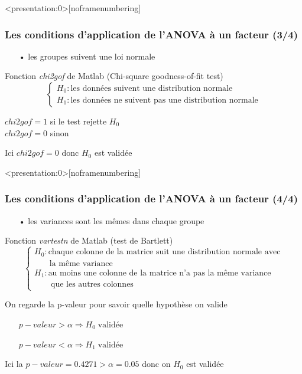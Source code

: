 \documentclass{beamer}
\begin{document}
\begin{frame}<presentation:0>[noframenumbering]
\frametitle{Les conditions d'application de l'ANOVA à un facteur (3/4)}
\begin{itemize}
\item[•] les groupes suivent une loi normale \\
\end{itemize} 
\phantom{newline}

Fonction \emph{chi2gof} de Matlab (Chi-square goodness-of-fit test)
\[ \left\{\begin{array}{ll}
H_0 : \text{les données suivent une distribution normale} \\
H_1 : \text{les données ne suivent pas une distribution normale}
\end{array}\right. \]

\phantom{newline}

$chi2gof = 1$ si le test rejette $H_0$ \\
$chi2gof = 0$ sinon \\

\phantom{newline}

Ici $chi2gof = 0$ donc $H_0$ est validée \\

\end{frame}

\begin{frame}<presentation:0>[noframenumbering]
\frametitle{Les conditions d'application de l'ANOVA à un facteur (4/4)}
\begin{itemize}
\item[•] les variances sont les mêmes dans chaque groupe \\
\end{itemize} 

Fonction \emph{vartestn} de Matlab (test de Bartlett)
\[ \left\{\begin{array}{ll}
H_0 : \text{chaque colonne de la matrice suit une distribution normale avec} \\
\quad \;\;\; \text{la même variance} \\
H_1 : \text{au moins une colonne de la matrice n'a pas la même variance} \\
\qquad \text{que les autres colonnes}
\end{array}\right. \]

On regarde la p-valeur pour savoir quelle hypothèse on valide \\
\begin{itemize}
\item[] $p-valeur > \alpha \Rightarrow H_0 \; \text{validée}$ \\
\item[] $p-valeur < \alpha \Rightarrow H_1 \; \text{validée}$ \\
\end{itemize} 

\phantom{newline}

Ici la $p-valeur=0.4271 > \alpha = 0.05$ donc on $H_0$ est validée
\end{frame}
\end{document}
